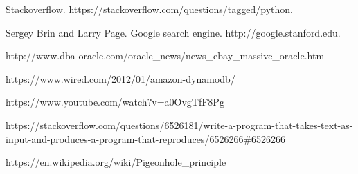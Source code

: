 \documentclass[a4paper, 11pt]{article}
\begin{document}
\begin{thebibliography}{9}

\bibitem{} 
Stackoverflow. https://stackoverflow.com/questions/tagged/python.

\bibitem{} 
Sergey Brin and Larry Page. Google search engine. http://google.stanford.edu.

\bibitem{}
http://www.dba-oracle.com/oracle\_news/news\_ebay\_massive\_oracle.htm

\bibitem{}
https://www.wired.com/2012/01/amazon-dynamodb/

\bibitem{}
https://www.youtube.com/watch?v=a0OvgTfF8Pg

\bibitem{}
https://stackoverflow.com/questions/6526181/write-a-program-that-takes-text-as-input-and-produces-a-program-that-reproduces/6526266\#6526266

\bibitem{}
https://en.wikipedia.org/wiki/Pigeonhole\_principle


\end{thebibliography}
\end{document}

